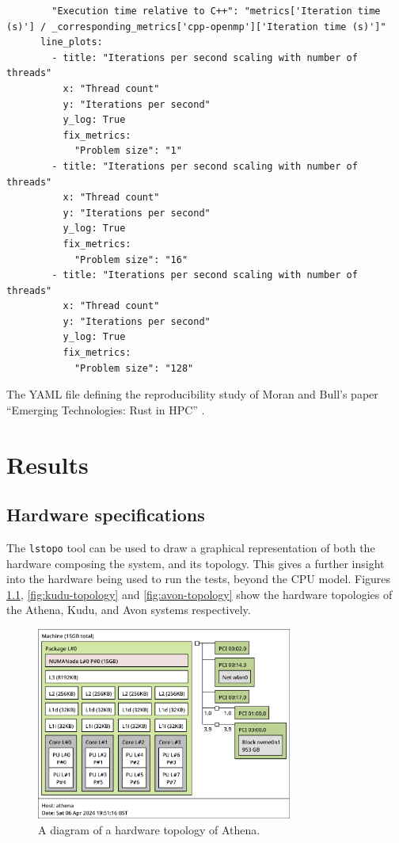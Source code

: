 \begin{listing}[H]
\begin{verbatim}
        "Execution time relative to C++": "metrics['Iteration time (s)'] / _corresponding_metrics['cpp-openmp']['Iteration time (s)']"
      line_plots:
        - title: "Iterations per second scaling with number of threads"
          x: "Thread count"
          y: "Iterations per second"
          y_log: True
          fix_metrics:
            "Problem size": "1"
        - title: "Iterations per second scaling with number of threads"
          x: "Thread count"
          y: "Iterations per second"
          y_log: True
          fix_metrics:
            "Problem size": "16"
        - title: "Iterations per second scaling with number of threads"
          x: "Thread count"
          y: "Iterations per second"
          y_log: True
          fix_metrics:
            "Problem size": "128"
    \end{verbatim}
    \caption{The YAML file defining the reproducibility study of Moran and Bull's paper ``Emerging Technologies: Rust in HPC'' \cite{moranEmergingTechnologiesRust2023}.}
    \label{listing:athena-lscpu}
\end{listing}





\chapter{Results}
\label{ch:results-appendix}

\section{Hardware specifications}
\label{sec:hardware-specifications}

The \texttt{lstopo} tool can be used to draw a graphical representation of both the hardware composing the system, and its topology. This gives a further insight into the hardware being used to run the tests, beyond the CPU model. Figures \ref{fig:athena-topology}, \ref{fig:kudu-topology} and \ref{fig:avon-topology} show the hardware topologies of the Athena, Kudu, and Avon systems respectively.

\begin{figure}[H]
    \centering
    \includegraphics[width=0.75\textwidth]{images/8_appendix/athena-topology.png}
    \caption{A diagram of a hardware topology of Athena.}
    \label{fig:athena-topology}
\end{figure}

